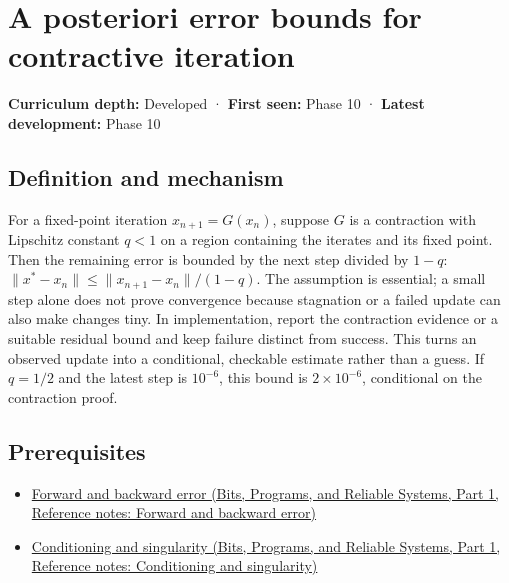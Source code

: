 \hypertarget{appendix-d83b0ad1be7f}{}\label{referencestart:appendix-d83b0ad1be7f}
\section{A posteriori error bounds for contractive iteration}\label{appendix-d83b0ad1be7f-a-posteriori-error-bounds-for-contractive-iteration}

\hypertarget{appendix-d83b0ad1be7f-a-posteriori-error-bounds-for-contractive-iteration}{}

\textbf{Curriculum depth:} Developed · \textbf{First seen:} Phase 10 · \textbf{Latest development:} Phase 10

\begin{allmightroledefinition}

\subsection{Definition and mechanism}\label{appendix-d83b0ad1be7f-definition-and-mechanism}

\hypertarget{appendix-d83b0ad1be7f-definition-and-mechanism}{}

For a fixed-point iteration \(x_{n+1}=G(x_n)\), suppose \(G\) is a contraction with Lipschitz constant \(q<1\) on a region containing the iterates and its fixed point. Then the remaining error is bounded by the next step divided by \(1-q\): \(\|x^*-x_n\|\le\|x_{n+1}-x_n\|/(1-q)\). The assumption is essential; a small step alone does not prove convergence because stagnation or a failed update can also make changes tiny. In implementation, report the contraction evidence or a suitable residual bound and keep failure distinct from success. This turns an observed update into a conditional, checkable estimate rather than a guess. If \(q=1/2\) and the latest step is \(10^{-6}\), this bound is \(2\times10^{-6}\), conditional on the contraction proof.

\end{allmightroledefinition}

\subsection{Prerequisites}\label{appendix-d83b0ad1be7f-prerequisites}

\hypertarget{appendix-d83b0ad1be7f-prerequisites}{}

\begin{itemize}
\tightlist
\item
  \href{../01-Bits-Programs-and-Reliable-Systems-P01/main.pdf\#nameddest=appendix-a7fbaf6d1b1c}{Forward and backward error (Bits, Programs, and Reliable Systems, Part 1, Reference notes: Forward and backward error)}
\item
  \href{../01-Bits-Programs-and-Reliable-Systems-P01/main.pdf\#nameddest=appendix-8f6a01f284a7}{Conditioning and singularity (Bits, Programs, and Reliable Systems, Part 1, Reference notes: Conditioning and singularity)}
\end{itemize}

